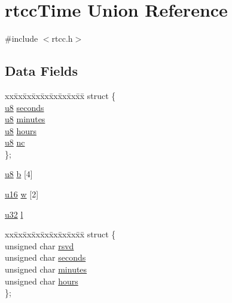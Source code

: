 \hypertarget{unionrtcc_time}{\section{rtcc\-Time Union Reference}
\label{unionrtcc_time}
}


{\ttfamily \#include $<$rtcc.\-h$>$}

\subsection*{Data Fields}
\begin{DoxyCompactItemize}
\item 
\begin{tabbing}
xx\=xx\=xx\=xx\=xx\=xx\=xx\=xx\=xx\=\kill
struct \{\\
\>\hyperlink{p8_2pinguino_2core_2typedef_8h_aed742c436da53c1080638ce6ef7d13de}{u8} \hyperlink{unionrtcc_time_ae53e173daf8fcf970bb3324ae545f21c}{seconds}\\
\>\hyperlink{p8_2pinguino_2core_2typedef_8h_aed742c436da53c1080638ce6ef7d13de}{u8} \hyperlink{unionrtcc_time_a517646d9969ae9c9f8921e133b1b872b}{minutes}\\
\>\hyperlink{p8_2pinguino_2core_2typedef_8h_aed742c436da53c1080638ce6ef7d13de}{u8} \hyperlink{unionrtcc_time_af8ebb6bc008ed8d3be395faf75ec1ebc}{hours}\\
\>\hyperlink{p8_2pinguino_2core_2typedef_8h_aed742c436da53c1080638ce6ef7d13de}{u8} \hyperlink{unionrtcc_time_a03419770df9441078fe8b24fce635d41}{nc}\\
\}; \\

\end{tabbing}\item 
\hyperlink{p8_2pinguino_2core_2typedef_8h_aed742c436da53c1080638ce6ef7d13de}{u8} \hyperlink{unionrtcc_time_a462b9a1d97366cdca568e1212ab06255}{b} \mbox{[}4\mbox{]}
\item 
\hyperlink{p8_2pinguino_2core_2typedef_8h_a50b0d1c7a54fa09a64a3ac111c778520}{u16} \hyperlink{unionrtcc_time_aee6ae13fa41deb7b244fe96f8b34be1d}{w} \mbox{[}2\mbox{]}
\item 
\hyperlink{p8_2pinguino_2core_2typedef_8h_a2caf5cd7bcdbe1eefa727f44ffb10bac}{u32} \hyperlink{unionrtcc_time_a97b22435f07e68bf751cddd2226228ab}{l}
\item 
\begin{tabbing}
xx\=xx\=xx\=xx\=xx\=xx\=xx\=xx\=xx\=\kill
struct \{\\
\>unsigned char \hyperlink{unionrtcc_time_a49330ff1e61822649a18c185fddcf0b1}{rsvd}\\
\>unsigned char \hyperlink{unionrtcc_time_a173027d8c297c3e800a19ec32217953e}{seconds}\\
\>unsigned char \hyperlink{unionrtcc_time_acf4ceb0d1cb80a37559ed7fd414cd389}{minutes}\\
\>unsigned char \hyperlink{unionrtcc_time_ad6bf06b59feb7f83117fd66cd2f365ad}{hours}\\
\}; \\


\end{tabbing}
\end{DoxyCompactItemize}
